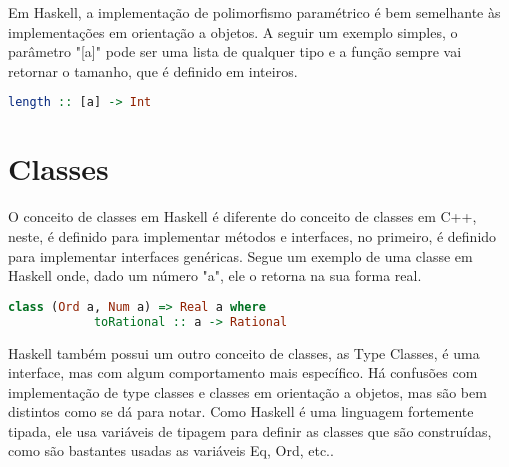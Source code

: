 \documentclass{article}
\begin{document}
    Em Haskell, a implementação de polimorfismo paramétrico é bem semelhante às
    implementações em orientação a objetos. A seguir um exemplo simples, o
    parâmetro "[a]" pode ser uma lista de qualquer tipo e a função sempre vai
    retornar o tamanho, que é definido em inteiros. 
    \begin{lstlisting}[language=Haskell, frame=single]
        length :: [a] -> Int
    \end{lstlisting}
        
\section*{Classes}
    O conceito de classes em Haskell é diferente do conceito de classes em C++,
    neste, é definido para implementar métodos e interfaces, no primeiro, é
    definido para implementar interfaces genéricas. Segue um exemplo de uma
    classe em Haskell onde, dado um número "a", ele o retorna na sua forma
    real.
    \begin{lstlisting}[language=Haskell, frame=single]
        class (Ord a, Num a) => Real a where
            toRational :: a -> Rational
    \end{lstlisting}
        
    Haskell também possui um outro conceito de classes, as Type Classes, é uma
    interface, mas com algum comportamento mais específico. Há confusões com
    implementação de type classes e classes em orientação a objetos, mas são
    bem distintos como se dá para notar. Como Haskell é uma linguagem
    fortemente tipada, ele usa variáveis de tipagem para definir as classes que
    são construídas, como são bastantes usadas as variáveis Eq, Ord, etc..
\end{document}
